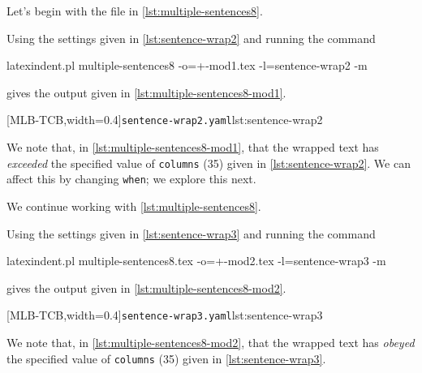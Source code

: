 \documentclass[10pt]{article}
\begin{document}
 \begin{example}
 Let's begin with the file in \cref{lst:multiple-sentences8}.


 Using the settings given in \cref{lst:sentence-wrap2} and running the command

 \begin{commandshell}
latexindent.pl multiple-sentences8 -o=+-mod1.tex -l=sentence-wrap2 -m
   \end{commandshell}

 gives the output given in \cref{lst:multiple-sentences8-mod1}.

 \begin{cmhtcbraster}[raster columns=2,
   raster left skip=-1.5cm,
   raster right skip=-0cm,
   raster column skip=.06\linewidth]
  [MLB-TCB,width=0.4\linewidth]{\texttt{sentence-wrap2.yaml}}{lst:sentence-wrap2}
 \end{cmhtcbraster}

 We note that, in \cref{lst:multiple-sentences8-mod1}, that the wrapped text has
 \emph{exceeded} the specified value of \texttt{columns} (35) given in
 \cref{lst:sentence-wrap2}. We can affect this by changing \texttt{when}; we explore this
 next.
 \end{example}

 \begin{example}
 We continue working with \cref{lst:multiple-sentences8}.

 Using the settings given in \cref{lst:sentence-wrap3} and running the command

 \begin{commandshell}
latexindent.pl multiple-sentences8.tex -o=+-mod2.tex -l=sentence-wrap3 -m
   \end{commandshell}

 gives the output given in \cref{lst:multiple-sentences8-mod2}.

 \begin{cmhtcbraster}[raster columns=2,
   raster left skip=-1.5cm,
   raster right skip=-0cm,
   raster column skip=.06\linewidth]
  [MLB-TCB,width=0.4\linewidth]{\texttt{sentence-wrap3.yaml}}{lst:sentence-wrap3}
 \end{cmhtcbraster}

 We note that, in \cref{lst:multiple-sentences8-mod2}, that the wrapped text has
 \emph{obeyed} the specified value of \texttt{columns} (35) given in
 \cref{lst:sentence-wrap3}.
 \end{example}
\end{document}
